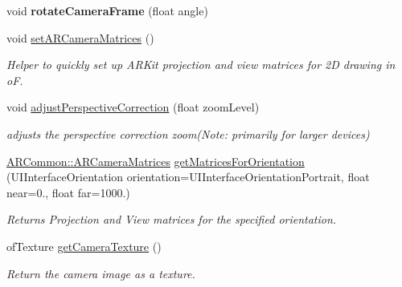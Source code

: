 \begin{DoxyCompactItemize}
void {\bfseries rotate\+Camera\+Frame} (float angle)
\item 
\mbox{\label{class_a_r_processor_a2ffd8b9518388be29eba6affe4d4d152}} 
void \hyperlink{class_a_r_processor_a2ffd8b9518388be29eba6affe4d4d152}{set\+A\+R\+Camera\+Matrices} ()
\begin{DoxyCompactList}\small\item\em Helper to quickly set up A\+R\+Kit projection and view matrices for 2D drawing in oF. \end{DoxyCompactList}\item 
\mbox{\label{class_a_r_processor_a17fbdf84c8e82e7f781ea0228d77dfea}} 
void \hyperlink{class_a_r_processor_a17fbdf84c8e82e7f781ea0228d77dfea}{adjust\+Perspective\+Correction} (float zoom\+Level)
\begin{DoxyCompactList}\small\item\em adjusts the perspective correction zoom(\+Note\+: primarily for larger devices) \end{DoxyCompactList}\item 
\mbox{\label{class_a_r_processor_abcd684d805e880aed72c2eb56a65978f}} 
\hyperlink{struct_a_r_common_1_1_a_r_camera_matrices}{A\+R\+Common\+::\+A\+R\+Camera\+Matrices} \hyperlink{class_a_r_processor_abcd684d805e880aed72c2eb56a65978f}{get\+Matrices\+For\+Orientation} (U\+I\+Interface\+Orientation orientation=U\+I\+Interface\+Orientation\+Portrait, float near=0., float far=1000.)
\begin{DoxyCompactList}\small\item\em Returns Projection and View matrices for the specified orientation. \end{DoxyCompactList}\item 
\mbox{\label{class_a_r_processor_a5eb8045000bc6e0ad3d41d7bbf832047}} 
of\+Texture \hyperlink{class_a_r_processor_a5eb8045000bc6e0ad3d41d7bbf832047}{get\+Camera\+Texture} ()
\begin{DoxyCompactList}\small\item\em Return the camera image as a texture. \end{DoxyCompactList}\item 
\mbox{\label{class_a_r_processor_a82a9b334360ebccd844e7cf5584eff8b}} 

\end{DoxyCompactItemize}
